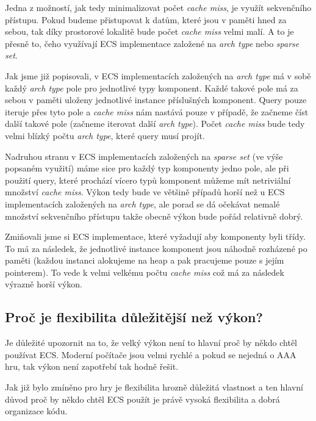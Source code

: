 Jedna z možností, jak tedy minimalizovat počet \textit{cache miss}, je využít sekvenčního přístupu. Pokud budeme přistupovat k datům, které jsou v paměti hned za sebou, tak díky prostorové lokalitě bude počet \textit{cache miss} velmi malí. A to je přesně to, čeho využívají ECS implementace založené na \textit{arch type} nebo \textit{sparse set}.

Jak jsme již popisovali, v ECS implementacích založených na \textit{arch type} má v sobě každý \textit{arch type} pole pro jednotlivé typy komponent. Každé takové pole má za sebou v paměti uloženy jednotlivé instance příslušných komponent. Query pouze iteruje přes tyto pole a \textit{cache miss} nám nastává pouze v případě, že začneme číst další takové pole (začneme iterovat další \textit{arch type}). Počet \textit{cache miss} bude tedy velmi blízký počtu \textit{arch type}, které query musí projít.

Nadruhou stranu v ECS implementacích založených na \textit{sparse set} (ve výše popsaném využití) máme sice pro každý typ komponenty jedno pole, ale při použití query, které prochází vícero typů komponent můžeme mít netriviální množství \textit{cache miss}. Výkon tedy bude ve většině případů horší než u ECS implementacích založených na \textit{arch type}, ale porad se dá očekávat nemalé množství sekvenčního přístupu takže obecně výkon bude pořád relativně dobrý.

Zmiňovali jsme si ECS implementace, které vyžadují aby komponenty byli třídy. To má za následek, že jednotlivé instance komponent jsou náhodně rozházené po paměti (každou instanci alokujeme na heap a pak pracujeme pouze s jejím pointerem). To vede k velmi velkému počtu \textit{cache miss} což má za následek výrazně horší výkon.

\subsection{Proč je flexibilita důležitější než výkon?}

Je důležité upozornit na to, že velký výkon není to hlavní proč by někdo chtěl používat ECS. Moderní počítače jsou velmi rychlé a pokud se nejedná o AAA hru, tak výkon není zapotřebí tak hodně řešit. 

Jak již bylo zmíněno pro hry je flexibilita hrozně důležitá vlastnost a ten hlavní důvod proč by někdo chtěl ECS použít je právě vysoká flexibilita a dobrá organizace kódu.

